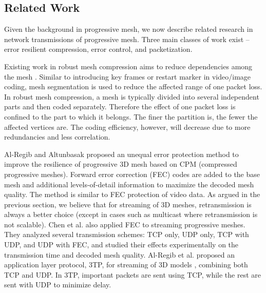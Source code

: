 \subsection{Related Work}
\label{s:model:related}

    Given the background in progressive mesh, we now describe
    related research in network transmissions of progressive mesh. 
    Three main classes of work exist 
    -- error resilient compression, error control, and
    packetization.

    Existing work in robust mesh compression aims to
    reduce dependencies among the mesh \cite{error:Park,error:Yan}.
    Similar to introducing key frames or restart marker in video/image
    coding, mesh
    segmentation is used to reduce the affected range of one
    packet loss. In robust mesh compression, a mesh is typically
    divided into several independent parts and then coded separately.
    Therefore the effect of one packet loss is confined to the part to which
    it belongs. The finer the partition is, the fewer the affected vertices
    are.  The coding efficiency, however, will decrease
    due to more redundancies and less correlation.

    Al-Regib and Altunbasak \cite{unequal:Al-Regib} proposed an
    unequal error protection method to improve the resilience of
    progressive 3D mesh based on CPM (compressed progressive meshes). Forward error
    correction (FEC) codes are added to the
    base mesh and additional levels-of-detail information to maximize 
    the decoded mesh quality.  The method is similar to FEC protection 
    of video data.
    As argued in the previous section, we believe that for streaming
    of 3D meshes, retransmission is always a better choice (except in
    cases such as multicast where retransmission is not scalable).
    Chen et al. \cite{chen05hybrid} also applied FEC to streaming
    progressive meshes. They analyzed several transmission schemes:
    TCP only, UDP only, TCP with UDP, and UDP with FEC, and studied
    their effects experimentally on the transmission time and decoded
    mesh quality.
    Al-Regib et al. proposed an application layer protocol, 3TP,
    for streaming of 3D models \cite{3tpregib}, combining both TCP 
    and UDP.  In 3TP, important packets are sent using
    TCP, while the rest are sent with UDP to minimize delay.

